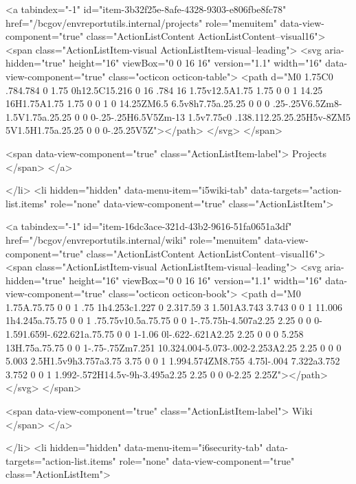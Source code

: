     
    <a tabindex="-1" id="item-3b32f25e-8afe-4328-9303-e806fbe8fc78" href="/bcgov/envreportutils.internal/projects" role="menuitem" data-view-component="true" class="ActionListContent ActionListContent--visual16">
        <span class="ActionListItem-visual ActionListItem-visual--leading">
          <svg aria-hidden="true" height="16" viewBox="0 0 16 16" version="1.1" width="16" data-view-component="true" class="octicon octicon-table">
    <path d="M0 1.75C0 .784.784 0 1.75 0h12.5C15.216 0 16 .784 16 1.75v12.5A1.75 1.75 0 0 1 14.25 16H1.75A1.75 1.75 0 0 1 0 14.25ZM6.5 6.5v8h7.75a.25.25 0 0 0 .25-.25V6.5Zm8-1.5V1.75a.25.25 0 0 0-.25-.25H6.5V5Zm-13 1.5v7.75c0 .138.112.25.25.25H5v-8ZM5 5V1.5H1.75a.25.25 0 0 0-.25.25V5Z"></path>
</svg>
        </span>
      
        <span data-view-component="true" class="ActionListItem-label">
          Projects
</span>      
</a>
  
</li>
        <li hidden="hidden" data-menu-item="i5wiki-tab" data-targets="action-list.items" role="none" data-view-component="true" class="ActionListItem">
    
    
    <a tabindex="-1" id="item-16dc3ace-321d-43b2-9616-51fa0651a3df" href="/bcgov/envreportutils.internal/wiki" role="menuitem" data-view-component="true" class="ActionListContent ActionListContent--visual16">
        <span class="ActionListItem-visual ActionListItem-visual--leading">
          <svg aria-hidden="true" height="16" viewBox="0 0 16 16" version="1.1" width="16" data-view-component="true" class="octicon octicon-book">
    <path d="M0 1.75A.75.75 0 0 1 .75 1h4.253c1.227 0 2.317.59 3 1.501A3.743 3.743 0 0 1 11.006 1h4.245a.75.75 0 0 1 .75.75v10.5a.75.75 0 0 1-.75.75h-4.507a2.25 2.25 0 0 0-1.591.659l-.622.621a.75.75 0 0 1-1.06 0l-.622-.621A2.25 2.25 0 0 0 5.258 13H.75a.75.75 0 0 1-.75-.75Zm7.251 10.324.004-5.073-.002-2.253A2.25 2.25 0 0 0 5.003 2.5H1.5v9h3.757a3.75 3.75 0 0 1 1.994.574ZM8.755 4.75l-.004 7.322a3.752 3.752 0 0 1 1.992-.572H14.5v-9h-3.495a2.25 2.25 0 0 0-2.25 2.25Z"></path>
</svg>
        </span>
      
        <span data-view-component="true" class="ActionListItem-label">
          Wiki
</span>      
</a>
  
</li>
        <li hidden="hidden" data-menu-item="i6security-tab" data-targets="action-list.items" role="none" data-view-component="true" class="ActionListItem">
    

